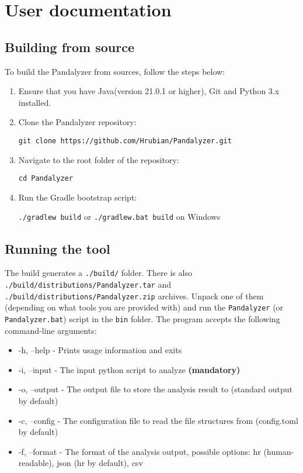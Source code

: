 \chapter{User documentation}\label{ch:user-documentation}


\section{Building from source}

To build the Pandalyzer from sources, follow the steps below:
\begin{enumerate}
    \item Ensure that you have Java(version 21.0.1 or higher), Git and Python 3.x installed.
    \item Clone the Pandalyzer repository:

    \verb|git clone https://github.com/Hrubian/Pandalyzer.git|
    \item Navigate to the root folder of the repository:

    \verb|cd Pandalyzer|
    \item Run the Gradle bootstrap script:

    \verb|./gradlew build| or \verb|./gradlew.bat build| on Windows
\end{enumerate}

\section{Running the tool}

The build generates a \verb|./build/| folder.
There is also \verb|./build/distributions/Pandalyzer.tar| and \verb|./build/distributions/Pandalyzer.zip| archives.
Unpack one of them (depending on what tools you are provided with) and run the \verb|Pandalyzer| (or
\verb|Pandalyzer.bat|) script in the \verb|bin| folder.
The program accepts the following command-line arguments:
\begin{itemize}
    \item -h, --help - Prints usage information and exits
    \item -i, --input - The input python script to analyze \textbf{(mandatory)}
    \item -o, --output - The output file to store the analysis result to (standard output by default)
    \item -c, --config - The configuration file to read the file structures from (config.toml by default)
    \item -f, --format - The format of the analysis output, possible options: hr (human-readable), json (hr by default), csv
\end{itemize}
